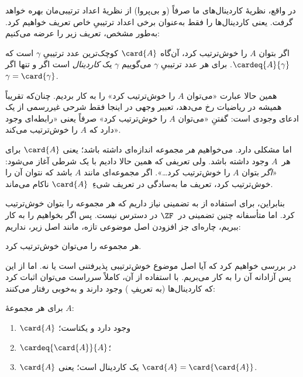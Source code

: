 \documentclass[../../../include/open-logic-section]{subfiles}
\begin{document}

در واقع، نظریهٔ کاردینال‌های ما صرفاً (و بی‌پروا) از نظریهٔ اعداد
ترتیبی‌مان بهره خواهد گرفت. یعنی کاردینال‌ها را فقط به‌عنوان برخی
اعداد ترتیبیِ خاص تعریف خواهیم کرد. به‌طور مشخص، تعریف زیر را عرضه
می‌کنیم:

\begin{defn}
اگر بتوان $A$ را خوش‌ترتیب کرد، آن‌گاه $\card{A}$ کوچک‌ترین عدد
ترتیبیِ $\gamma$ است که $\cardeq{A}{\gamma}$. برای هر عدد ترتیبیِ
$\gamma$ می‌گوییم $\gamma$ یک \emph{کاردینال} است اگر و تنها اگر
$\gamma = \card{\gamma}$.
\end{defn}

همین حالا عبارت «می‌توان $A$ را خوش‌ترتیب کرد» را به کار بردیم.
چنان‌که تقریباً همیشه در ریاضیات رخ می‌دهد، تعبیر وجهی در اینجا فقط
شرحی غیررسمی از یک ادعای وجودی است: گفتنِ «می‌توان $A$ را خوش‌ترتیب
کرد» صرفاً یعنی «رابطه‌ای وجود دارد که $A$ را خوش‌ترتیب می‌کند».

اما  مشکلی دارد. می‌خواهیم \emph{هر}
مجموعه اندازه‌ای داشته باشد؛ یعنی $\card{A}$ برای هر~$A$ وجود داشته
باشد. ولی تعریفی که همین حالا دادیم با یک شرطی آغاز می‌شود:
«\emph{اگر} بتوان $A$ را خوش‌ترتیب کرد\ldots». اگر مجموعه‌ای مانند
$A$ باشد که نتوان آن را خوش‌ترتیب کرد، تعریف ما به‌سادگی در تعریف
شیءِ~$\card{A}$ ناکام می‌ماند.

بنابراین، برای استفاده از  به تضمینی
نیاز داریم که هر مجموعه را بتوان خوش‌ترتیب کرد. اما متأسفانه چنین
تضمینی در~$\ZF$ در دسترس نیست. پس اگر بخواهیم
 را به کار ببریم، چاره‌ای جز افزودن اصل
موضوعی تازه، مانند اصل زیر، نداریم:
\begin{axiom}
هر مجموعه را می‌توان خوش‌ترتیب کرد.
\end{axiom}
در  بررسی خواهیم کرد که آیا اصل موضوع
خوش‌ترتیبی پذیرفتنی است یا نه. اما از این پس آزادانه آن را به کار
می‌بریم. با استفاده از آن، کاملاً سرراست می‌توان اثبات کرد که
کاردینال‌ها (به تعریفِ ) وجود دارند و
به‌خوبی رفتار می‌کنند:

\begin{lem}
برای هر مجموعهٔ $A$:
\begin{enumerate}
	\item{} $\card{A}$ وجود دارد و یکتاست؛
	\item{} $\cardeq{\card{A}}{A}$؛
	\item{} $\card{A}$ یک کاردینال است؛ یعنی
	$\card{A} = \card{\card{A}}$.
\end{enumerate}
\end{lem}
\end{document}
